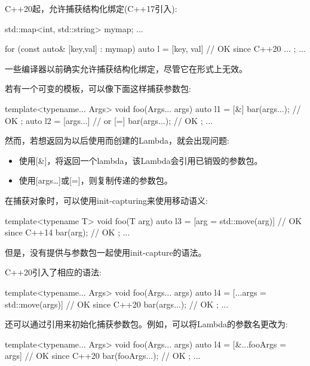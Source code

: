 
C++20起，允许捕获结构化绑定(C++17引入):

\begin{cpp}
std::map<int, std::string> mymap;
...

for (const auto& [key,val] : mymap) {
	auto l = [key, val] { // OK since C++20
				...
			};
	...
}
\end{cpp}

一些编译器以前确实允许捕获结构化绑定，尽管它在形式上无效。


若有一个可变的模板，可以像下面这样捕获参数包:

\begin{cpp}
template<typename... Args>
void foo(Args... args)
{
	auto l1 = [&] {
					bar(args...); // OK
				};
	auto l2 = [args...] { // or [=]
					bar(args...); // OK
				};
	...
}
\end{cpp}

然而，若想返回为以后使用而创建的Lambda，就会出现问题:

\begin{itemize}
\item 
使用[\&]，将返回一个lambda，该Lambda会引用已销毁的参数包。

\item 
使用[args…]或[=]，则复制传递的参数包。
\end{itemize}

在捕获对象时，可以使用init-capturing来使用移动语义:

\begin{cpp}
template<typename T>
void foo(T arg)
{
	auto l3 = [arg = std::move(arg)] { // OK since C++14
				bar(arg); // OK
			};
	...
}
\end{cpp}

但是，没有提供与参数包一起使用init-capture的语法。

C++20引入了相应的语法:

\begin{cpp}
template<typename... Args>
void foo(Args... args)
{
	auto l4 = [...args = std::move(args)] { // OK since C++20
				bar(args...); // OK
			};
	...
}
\end{cpp}

还可以通过引用来初始化捕获参数包。例如，可以将Lambda的参数名更改为:

\begin{cpp}
template<typename... Args>
void foo(Args... args)
{
	auto l4 = [&...fooArgs = args] { // OK since C++20
				bar(fooArgs...); // OK
			};
	...
}
\end{cpp}

